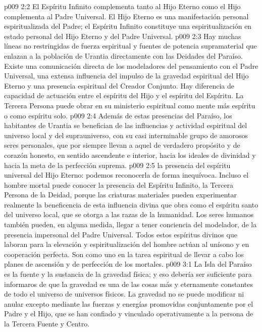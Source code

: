\vs p009 2:2 El Espíritu Infinito complementa tanto al Hijo Eterno como el Hijo complementa al Padre Universal. El Hijo Eterno es una manifestación personal espiritualizada del Padre; el Espíritu Infinito constituye una espiritualización en estado personal del Hijo Eterno y del Padre Universal.
\vs p009 2:3 Hay muchas líneas no restringidas de fuerza espiritual y fuentes de potencia supramaterial que enlazan a la población de Urantia directamente con las Deidades del Paraíso. Existe una comunicación directa de los modeladores del pensamiento con el Padre Universal, una extensa influencia del impulso de la gravedad espiritual del Hijo Eterno y una presencia espiritual del Creador Conjunto. Hay diferencia de capacidad de actuación entre el espíritu del Hijo y el espíritu del Espíritu. La Tercera Persona puede obrar en su ministerio espiritual como mente más espíritu o como espíritu solo.
\vs p009 2:4 Además de estas presencias del Paraíso, los habitantes de Urantia se benefician de las influencias y actividad espiritual del universo local y del suprauniverso, con su casi interminable grupo de amorosos seres personales, que por siempre llevan a aquel de verdadero propósito y de corazón honesto, en sentido ascendente e interior, hacia los ideales de divinidad y hacia la meta de la perfección suprema.
\vs p009 2:5  la presencia del espíritu universal del Hijo Eterno: podemos reconocerla de forma inequívoca. Incluso el hombre mortal puede conocer la presencia del Espíritu Infinito, la Tercera Persona de la Deidad, porque las criaturas materiales pueden experimentar realmente la beneficencia de esta influencia divina que obra como el espíritu santo del universo local, que se otorga a las razas de la humanidad. Los seres humanos también pueden, en alguna medida, llegar a tener conciencia del modelador, de la presencia impersonal del Padre Universal. Todos estos espíritus divinos que laboran para la elevación y espiritualización del hombre actúan al unísono y en cooperación perfecta. Son como uno en la tarea espiritual de llevar a cabo los planes de ascensión y de perfección de los mortales.
\vs p009 3:1 La Isla del Paraíso es la fuente y la sustancia de la gravedad física; y eso debería ser suficiente para informaros de que la gravedad es una de las cosas más  y eternamente constantes de todo el universo de universos físicos. La gravedad no se puede modificar ni anular excepto mediante las fuerzas y energías promovidas conjuntamente por el Padre y el Hijo, que se han confiado y vinculado operativamente a la persona de la Tercera Fuente y Centro.
